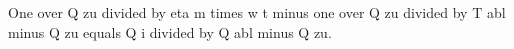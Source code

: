 One over Q zu divided by eta m times w t minus one over Q zu divided by T abl minus Q zu equals Q i divided by Q abl minus Q zu.